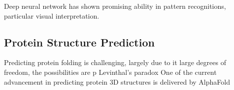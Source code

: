 Deep neural network has shown promising ability in pattern recognitions, particular visual interpretation.
\par 

\subsection{Protein Structure Prediction}
Predicting protein folding is challenging, largely due to it large degrees of freedom, the possibilities  are p Levinthal's paradox One of the current advancement in predicting protein 3D structures is delivered by AlphaFold
